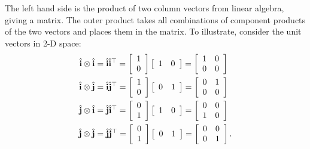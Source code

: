 The left hand side is the product of two column vectors from linear algebra, giving a matrix. The outer product takes all combinations of component products of the two vectors and places them in the matrix. To illustrate, consider the unit vectors in 2-D space:
\begin{subequations}
\begin{align}
  \hat{\mathbf{i}} \otimes \hat{\mathbf{i}} &= \hat{\mathbf{i}} \hat{\mathbf{i}}^\top
  = \left[ \begin{array}{c} 1 \\ 0 \end{array} \right] \left[ \begin{array}{c c} 1 & 0 \end{array} \right] 
  = \left[ \begin{array}{c c} 1 & 0 \\ 0 & 0 \end{array} \right] \\
  \hat{\mathbf{i}} \otimes \hat{\mathbf{j}} &= \hat{\mathbf{i}} \hat{\mathbf{j}}^\top
  = \left[ \begin{array}{c} 1 \\ 0 \end{array} \right] \left[ \begin{array}{c c} 0 & 1 \end{array} \right] 
  = \left[ \begin{array}{c c} 0 & 1 \\ 0 & 0 \end{array} \right] \\
  \hat{\mathbf{j}} \otimes \hat{\mathbf{i}} &= \hat{\mathbf{j}} \hat{\mathbf{i}}^\top
  = \left[ \begin{array}{c} 0 \\ 1 \end{array} \right] \left[ \begin{array}{c c} 1 & 0 \end{array} \right] 
  = \left[ \begin{array}{c c} 0 & 0 \\ 1 & 0 \end{array} \right] \\
  \hat{\mathbf{j}} \otimes \hat{\mathbf{j}} &= \hat{\mathbf{j}} \hat{\mathbf{j}}^\top
  = \left[ \begin{array}{c} 0 \\ 1 \end{array} \right] \left[ \begin{array}{c c} 0 & 1 \end{array} \right] 
  = \left[ \begin{array}{c c} 0 & 0 \\ 0 & 1 \end{array} \right] .
\end{align}
\end{subequations}
